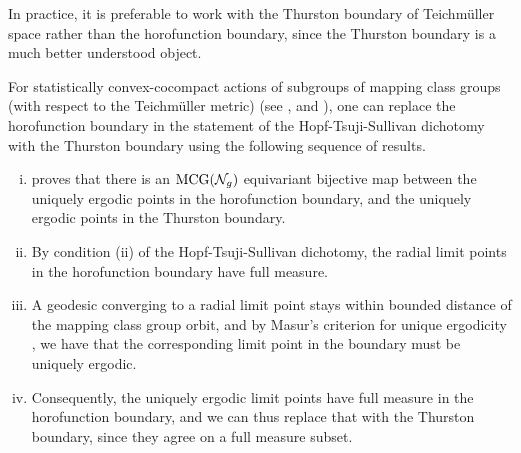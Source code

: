 \begin{remark}
  In practice, it is preferable to work with the Thurston boundary of Teichmüller space rather than the horofunction boundary, since the Thurston boundary is a much better understood object.

  For statistically convex-cocompact actions of subgroups of mapping class groups (with respect to the Teichmüller metric) (see \textcite{gekhtman2023dynamics}, and \textcite{CGTY}), one can replace the horofunction boundary in the statement of the Hopf-Tsuji-Sullivan dichotomy with the Thurston boundary using the following sequence of results.
  \begin{enumerate}[(i)]
  \item \textcite{miyachi2008teichmuller} proves that there is an $\mathrm{MCG}(\mathcal{N}_g)$ equivariant bijective map between the uniquely ergodic points in the horofunction boundary, and the uniquely ergodic points in the Thurston boundary.
  \item By condition (ii) of the Hopf-Tsuji-Sullivan dichotomy, the radial limit points in the horofunction boundary have full measure.
  \item A geodesic converging to a radial limit point stays within bounded distance of the mapping class group orbit, and by Masur's criterion for unique ergodicity \cite{masur1982interval}, we have that the corresponding limit point in the boundary must be uniquely ergodic.
  \item Consequently, the uniquely ergodic limit points have full measure in the horofunction boundary, and we can thus replace that with the Thurston boundary, since they agree on a full measure subset.
  \end{enumerate}


\end{remark}
